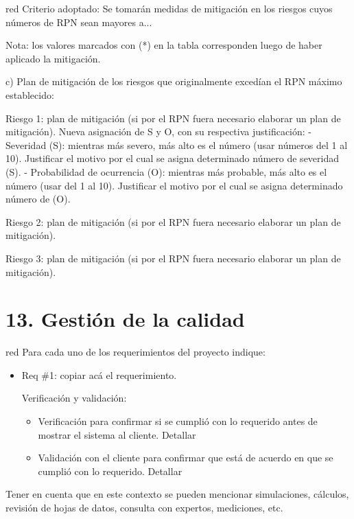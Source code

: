 \documentclass[11pt]{charter}
\begin{document}
\begin{consigna}{red}
Criterio adoptado: 
Se tomarán medidas de mitigación en los riesgos cuyos números de RPN sean mayores a...

Nota: los valores marcados con (*) en la tabla corresponden luego de haber aplicado la mitigación.

c) Plan de mitigación de los riesgos que originalmente excedían el RPN máximo establecido:
 
Riesgo 1: plan de mitigación (si por el RPN fuera necesario elaborar un plan de mitigación).
  Nueva asignación de S y O, con su respectiva justificación:
  - Severidad (S): mientras más severo, más alto es el número (usar números del 1 al 10).
          Justificar el motivo por el cual se asigna determinado número de severidad (S).
  - Probabilidad de ocurrencia (O): mientras más probable, más alto es el número (usar del 1 al 10).
          Justificar el motivo por el cual se asigna determinado número de (O).

Riesgo 2: plan de mitigación (si por el RPN fuera necesario elaborar un plan de mitigación).
 
Riesgo 3: plan de mitigación (si por el RPN fuera necesario elaborar un plan de mitigación).

\end{consigna}


\section{13. Gestión de la calidad}
\label{sec:calidad}

\begin{consigna}{red}
Para cada uno de los requerimientos del proyecto indique:
\begin{itemize} 
\item Req \#1: copiar acá el requerimiento.

Verificación y validación:

\begin{itemize}
\item Verificación para confirmar si se cumplió con lo requerido antes de mostrar el sistema al cliente. Detallar 
\item Validación con el cliente para confirmar que está de acuerdo en que se cumplió con lo requerido. Detallar  
\end{itemize}

\end{itemize}

Tener en cuenta que en este contexto se pueden mencionar simulaciones, cálculos, revisión de hojas de datos, consulta con expertos, mediciones, etc.

\end{consigna}
\end{document}
